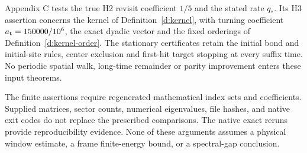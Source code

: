 Appendix C tests the true H2 revisit coefficient \(1/5\) and
the stated rate \(q_*\). Its H3 assertion concerns the kernel of
Definition~\ref{d:kernel}, with turning coefficient
\(a_{\rm t}=150000/10^6\), the exact dyadic vector and the
fixed orderings of Definition~\ref{d:kernel-order}. The stationary
certificates retain the initial bond and initial-site rules,
center exclusion and first-hit target stopping at every suffix
time. No periodic spatial walk, long-time remainder or parity
improvement enters these input theorems.

The finite assertions require regenerated mathematical index sets
and coefficients. Supplied matrices, sector counts, numerical
eigenvalues, file hashes, and native exit codes do not replace
the prescribed comparisons. The native exact reruns provide
reproducibility evidence. None of these
arguments assumes a physical window estimate, a frame finite-energy
bound, or a spectral-gap conclusion.
